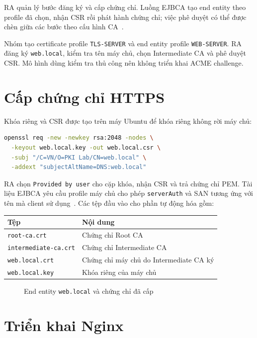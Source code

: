 \documentclass[11pt,a4paper]{article}
\newcommand{\screenshotholder}[3]{%
    \begin{figure}[H]
        \centering
        \fbox{%
            \parbox[c][2.4cm][c]{0.86\linewidth}{%
                \centering
                \textit{#1}%
            }%
        }
        \caption{#2}
        \label{#3}
    \end{figure}
}
\begin{document}
RA quản lý bước đăng ký và cấp chứng chỉ. Luồng EJBCA tạo end entity
theo profile đã chọn, nhận CSR rồi phát hành chứng chỉ; việc phê duyệt
có thể được chèn giữa các bước theo cấu hình CA~\cite{EJBCARAConcept}.

Nhóm tạo certificate profile \texttt{TLS-SERVER} và end entity profile
\texttt{WEB-SERVER}. RA đăng ký \texttt{web.local}, kiểm tra tên máy
chủ, chọn Intermediate CA và phê duyệt CSR. Mô hình dùng kiểm tra thủ
công nên không triển khai ACME challenge.

\section{Cấp chứng chỉ HTTPS}

Khóa riêng và CSR được tạo trên máy Ubuntu để khóa riêng không
rời máy chủ:

\begin{lstlisting}[language=bash]
openssl req -new -newkey rsa:2048 -nodes \
  -keyout web.local.key -out web.local.csr \
  -subj "/C=VN/O=PKI Lab/CN=web.local" \
  -addext "subjectAltName=DNS:web.local"
\end{lstlisting}

RA chọn \texttt{Provided by user} cho cặp khóa, nhận CSR và trả
chứng chỉ PEM.
Tài liệu EJBCA yêu cầu profile máy chủ cho phép
\texttt{serverAuth} và SAN tương ứng với tên mà client sử
dụng~\cite{EJBCAServerCertificates}.
Các tệp đầu vào cho phần tự động hóa gồm:

\begin{center}
\begin{tabular}{ll}
    \toprule
    \textbf{Tệp} & \textbf{Nội dung} \\
    \midrule
    \texttt{root-ca.crt} & Chứng chỉ Root CA \\
    \texttt{intermediate-ca.crt} & Chứng chỉ Intermediate CA \\
    \texttt{web.local.crt} & Chứng chỉ máy chủ do Intermediate CA ký \\
    \texttt{web.local.key} & Khóa riêng của máy chủ \\
    \bottomrule
\end{tabular}
\end{center}

\screenshotholder{RA UI sau khi phát hành}{
    End entity \texttt{web.local} và chứng chỉ đã cấp
}{
    fig:ejbca-ra-issued
}

\section{Triển khai Nginx}
\end{document}
